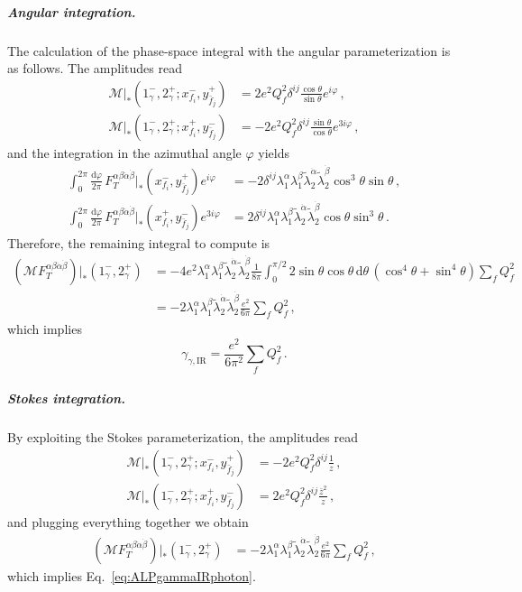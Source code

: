 \begin{subappendices}
\subparagraph{Angular integration.}
The calculation of the phase-space integral with the angular parameterization is as follows.
The amplitudes read
\begin{align}
    \mathcal M|_{*} (1^-_\gamma,2^+_\gamma; x_{f_i}^{-},y_{\bar f_j}^{+}) &= 2e^2 Q_f^2 \delta^{ij}\frac{\cos\theta}{\sin\theta}e^{i\varphi}\,, \\
    \mathcal M|_{*} (1^-_\gamma,2^+_\gamma; x_{f_i}^{+},y_{\bar f_j}^{-}) &= -2e^2 Q_f^2 \delta^{ij}\frac{\sin\theta}{\cos\theta}e^{3i\varphi}\,,
\end{align}
and the integration in the azimuthal angle $\varphi$ yields
\begin{align}
    \int_0^{2\pi}\frac{\text{d}\varphi}{2\pi}\,F_T^{\alpha\beta\dot\alpha\dot\beta}|_{*}(x_{f_i}^{-},y_{\bar f_j}^{+})e^{i\varphi} &= -2\delta^{ij}\lambda_1^\alpha \lambda_1^\beta \widetilde\lambda_2^{\dot\alpha} \widetilde\lambda_2^{\dot\beta} \cos^3\theta\sin\theta\,,  \\
    \int_0^{2\pi}\frac{\text{d}\varphi}{2\pi}\,F_T^{\alpha\beta\dot\alpha\dot\beta}|_{*}(x_{f_i}^{+},y_{\bar f_j}^{-})e^{3i\varphi} &=2\delta^{ij}\lambda_1^\alpha \lambda_1^\beta \widetilde\lambda_2^{\dot\alpha} \widetilde\lambda_2^{\dot\beta} \cos\theta\sin^3\theta \,.
\end{align}
Therefore, the remaining integral to compute is
\begin{align}
    (\mathcal M F_T^{\alpha\beta\dot\alpha\dot\beta})|_{*}(1^-_\gamma,2^+_\gamma) &= -4e^2 \lambda_1^\alpha \lambda_1^\beta \widetilde\lambda_2^{\dot\alpha} \widetilde\lambda_2^{\dot\beta}\frac{1}{8\pi}\int_0^{\pi/2}2\sin\theta\cos\theta \,\text{d}\theta\, (\cos^4\theta+\sin^4\theta)\sum_fQ_f^2 \nonumber \\
    &= -2\lambda_1^\alpha \lambda_1^\beta \widetilde\lambda_2^{\dot\alpha} \widetilde\lambda_2^{\dot\beta}\frac{e^2}{6\pi}\sum_fQ_f^2\,,
\end{align}
which implies
\begin{equation}\label{eq:ALPgammaIRphoton}
    \gamma_{\gamma,\text{IR}} = \frac{e^2}{6\pi^2} \sum_f Q_f^2\,.
\end{equation}

\subparagraph{Stokes integration.}
By exploiting the Stokes parameterization, the amplitudes read
\begin{align}
    \mathcal M|_{*} (1^-_\gamma,2^+_\gamma; x_{f_i}^{-},y_{\bar f_j}^{+}) &= -2e^2 Q_f^2 \delta^{ij}\frac{1}{z}\,, \\
    \mathcal M|_{*} (1^-_\gamma,2^+_\gamma; x_{f_i}^{+},y_{\bar f_j}^{-}) &= 2e^2 Q_f^2 \delta^{ij}\frac{\bar z^2}{z}\,,
\end{align}
and plugging everything together we obtain
\begin{align}
    (\mathcal M F_T^{\alpha\beta\dot\alpha\dot\beta})|_{*}(1^-_\gamma,2^+_\gamma)
    &= -2\lambda_1^\alpha \lambda_1^\beta \widetilde\lambda_2^{\dot\alpha} \widetilde\lambda_2^{\dot\beta}\frac{e^2}{6\pi}\sum_fQ_f^2\,,
\end{align}
which implies Eq.~\eqref{eq:ALPgammaIRphoton}.


\end{subappendices}

